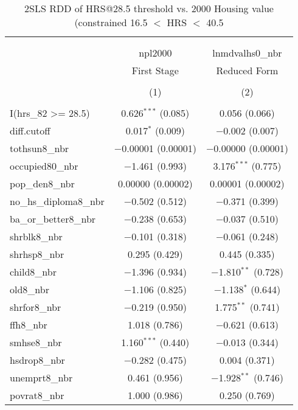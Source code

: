 \documentclass{article}
\begin{document}
\begin{table}[!htbp] \centering 
  \caption{2SLS RDD of HRS@28.5 threshold vs. 2000 Housing value (constrained 16.5 $<$ HRS $<$ 40.5} 
  \label{} 
\scriptsize 
\begin{tabular}{@{\extracolsep{5pt}}lcc} 
\\[-1.8ex]\hline 
\hline \\[-1.8ex] 
\\[-1.8ex] & npl2000 & lnmdvalhs0\_nbr \\ 
 & First Stage & Reduced Form \\ 
\\[-1.8ex] & (1) & (2)\\ 
\hline \\[-1.8ex] 
 I(hrs\_82 \textgreater = 28.5) & 0.626$^{***}$ (0.085) & 0.056 (0.066) \\ 
  diff.cutoff & 0.017$^{*}$ (0.009) & $-$0.002 (0.007) \\ 
  tothsun8\_nbr & $-$0.00001 (0.00001) & $-$0.00000 (0.00001) \\ 
  occupied80\_nbr & $-$1.461 (0.993) & 3.176$^{***}$ (0.775) \\ 
  pop\_den8\_nbr & 0.00000 (0.00002) & 0.00001 (0.00002) \\ 
  no\_hs\_diploma8\_nbr & $-$0.502 (0.512) & $-$0.371 (0.399) \\ 
  ba\_or\_better8\_nbr & $-$0.238 (0.653) & $-$0.037 (0.510) \\ 
  shrblk8\_nbr & $-$0.101 (0.318) & $-$0.061 (0.248) \\ 
  shrhsp8\_nbr & 0.295 (0.429) & 0.445 (0.335) \\ 
  child8\_nbr & $-$1.396 (0.934) & $-$1.810$^{**}$ (0.728) \\ 
  old8\_nbr & $-$1.106 (0.825) & $-$1.138$^{*}$ (0.644) \\ 
  shrfor8\_nbr & $-$0.219 (0.950) & 1.775$^{**}$ (0.741) \\ 
  ffh8\_nbr & 1.018 (0.786) & $-$0.621 (0.613) \\ 
  smhse8\_nbr & 1.160$^{***}$ (0.440) & $-$0.013 (0.344) \\ 
  hsdrop8\_nbr & $-$0.282 (0.475) & 0.004 (0.371) \\ 
  unemprt8\_nbr & 0.461 (0.956) & $-$1.928$^{**}$ (0.746) \\ 
  povrat8\_nbr & 1.000 (0.986) & 0.250 (0.769) \\ 

\end{tabular}
\end{table}
\end{document}
